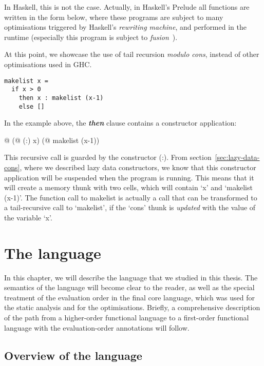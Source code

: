 \documentclass[diploma]{softlab-thesis}
\begin{document}
In Haskell, this is not the case. Actually, in Haskell's Prelude all functions are written 
in the form below, where these programs are subject to many optimisations triggered 
by Haskell's \textit{rewriting machine}, and performed in the runtime 
(especially this program is subject to \textit{fusion}~\cite{Coutts07}). 
\newline
\par At this point, we showcase the use of tail recursion \textit{modulo cons}, instead of other optimisations
used in GHC.

\begin{verbatim}
makelist x = 
  if x > 0 
    then x : makelist (x-1)
    else []
\end{verbatim}

In the example above, the \textbf{\textit{then}} clause contains a constructor 
application: 
\begin{center}
  @ (@ (:) x) (@ makelist (x-1))
\end{center}

This recursive call is guarded by the constructor (:).
From section~\ref{sec:lazy-data-cons}, where we described lazy data constructors,
we know that this constructor application will be suspended when 
the program is running. This means that it will create a memory 
thunk with two cells, which will contain `x' and `makelist (x-1)'.
The function call to makelist is actually a call that can be transformed 
to a tail-recursive call to `makelist', if the `cons' thunk is \textit{updated} 
with the value of the variable `x'. 

\chapter {The language}
\label{ch:language}

In this chapter, we will describe the language that we studied in this thesis.
The semantics of the language will become clear to the reader, as well as 
the special treatment of the evaluation order in the final core 
language, which was used for the static analysis and for the optimisations. Briefly, a 
comprehensive description of the path from a higher-order functional language 
to a first-order functional language with the evaluation-order annotations will follow.

\section {Overview of the language }
\label{sec:language-overview}
\end{document}
